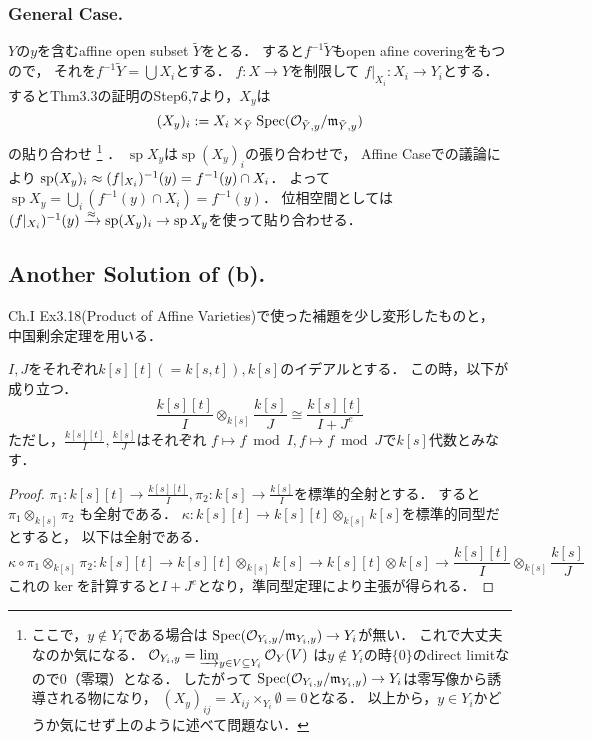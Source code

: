 \documentclass[a4paper]{jsarticle}
\newcommand{\shO}{\mathcal{O}}
\newcommand{\basesp}{\operatorname{sp}}
\begin{document}
    \subsubsection{General Case.}
    $Y$の$y$を含むaffine open subset $\tilde{Y}$をとる．
    すると$f^{-1}\tilde{Y}$もopen afine coveringをもつので，
    それを$f^{-1}\tilde{Y}=\bigcup X_{i}$とする．
    $f: X \to Y$を制限して
    $f|_{X_{i}}: X_{i} \to Y_i$とする．
    するとThm3.3の証明のStep6,7より，$X_y$は
    \[ (X_y)_{i}:=X_{i} \times_{\tilde{Y}} \Spec (\shO_{\tilde{Y},y}/\I{m}_{\tilde{Y},y}) \]
    の貼り合わせ
    \footnote
    {
    ここで，$y \not \in Y_i$である場合は
    $\Spec (\shO_{Y_i,y}/\I{m}_{Y_i,y}) \to Y_i$が無い．
    これで大丈夫なのか気になる．
    $\shO_{Y_i,y}=\varinjlim_{y \in V \subseteq Y_i} \shO_Y(V)$
    は$y \not \in Y_i$の時$\{0\}$のdirect limitなので$0$（零環）となる．
    したがって
    $\Spec (\shO_{Y_i,y}/\I{m}_{Y_i,y}) \to Y_i$は零写像から誘導される物になり，
    $(X_y)_{ij}=X_{ij} \times_{Y_i} \emptyset=0$となる．
    以上から，$y \in Y_i$かどうか気にせず上のように述べて問題ない．
    }
    ．
    $\basesp X_y$は$\basesp (X_y)_{i}$の張り合わせで，
    Affine Caseでの議論により
    $\basesp (X_y)_{i} \homeo (f|_{X_{i}})^{-1}(y)=f^{-1}(y) \cap X_{i}$．
    よって$\basesp X_y=\bigcup_{i} (f^{-1}(y) \cap X_{i})=f^{-1}(y)$．
    位相空間としては
    $(f|_{X_{i}})^{-1}(y) \homeomap \basesp (X_y)_{i} \to \basesp X_y$を使って貼り合わせる．

    \subsection{Another Solution of (b).}
    Ch.I Ex3.18(Product of Affine Varieties)で使った補題を少し変形したものと，
    中国剰余定理を用いる．

    \begin{Lemma}
        $I,J$をそれぞれ$k[s][t](=k[s,t]), k[s]$のイデアルとする．
        この時，以下が成り立つ．
        \[ \frac{k[s][t]}{I} \otimes_{k[s]} \frac{k[s]}{J} \cong \frac{k[s][t]}{I+J^e} \]
        ただし，$\frac{k[s][t]}{I}, \frac{k[s]}{J}$はそれぞれ
        $f \mapsto f \bmod I, f \mapsto f \bmod J$で$k[s]$代数とみなす．
    \end{Lemma}
    \begin{proof}
        $\pi_1: k[s][t] \to \frac{k[s][t]}{I}, \pi_2: k[s] \to \frac{k[s]}{I}$を標準的全射とする．
        すると$\pi_1 \otimes_{k[s]} \pi_2$
        も全射である．
        $\kappa: k[s][t] \to k[s][t] \otimes_{k[s]} k[s]$を標準的同型だとすると，
        以下は全射である．
        \[
            \kappa \circ \pi_1 \otimes_{k[s]} \pi_2:
                k[s][t] \to k[s][t] \otimes_{k[s]} k[s]
                \to k[s][t] \otimes k[s]
                \to \frac{k[s][t]}{I} \otimes_{k[s]} \frac{k[s]}{J}
        \]
        これの$\ker$を計算すると$I+J^e$となり，準同型定理により主張が得られる．
    \end{proof}
\end{document}
